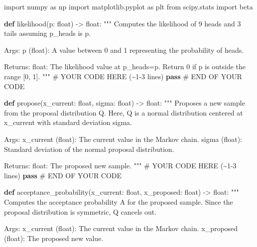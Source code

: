 \documentclass[
  letterpaper,
  DIV=11,
  numbers=noendperiod,
  oneside]{scrreprt}
\newenvironment{Shaded}{\begin{snugshade}}{\end{snugshade}}
\newcommand{\BuiltInTok}[1]{\textcolor[rgb]{0.00,0.23,0.31}{#1}}
\newcommand{\CommentTok}[1]{\textcolor[rgb]{0.37,0.37,0.37}{#1}}
\newcommand{\ControlFlowTok}[1]{\textcolor[rgb]{0.00,0.23,0.31}{\textbf{#1}}}
\newcommand{\ImportTok}[1]{\textcolor[rgb]{0.00,0.46,0.62}{#1}}
\newcommand{\KeywordTok}[1]{\textcolor[rgb]{0.00,0.23,0.31}{\textbf{#1}}}
\newcommand{\NormalTok}[1]{\textcolor[rgb]{0.00,0.23,0.31}{#1}}
\newcommand{\OperatorTok}[1]{\textcolor[rgb]{0.37,0.37,0.37}{#1}}
\newcommand{\RegionMarkerTok}[1]{\textcolor[rgb]{0.00,0.23,0.31}{#1}}
\theoremstyle{remark}
\begin{document}
\begin{Shaded}
\begin{Highlighting}[]
\ImportTok{import}\NormalTok{ numpy }\ImportTok{as}\NormalTok{ np}
\ImportTok{import}\NormalTok{ matplotlib.pyplot }\ImportTok{as}\NormalTok{ plt}
\ImportTok{from}\NormalTok{ scipy.stats }\ImportTok{import}\NormalTok{ beta}

\KeywordTok{def}\NormalTok{ likelihood(p: }\BuiltInTok{float}\NormalTok{) }\OperatorTok{{-}\textgreater{}} \BuiltInTok{float}\NormalTok{:}
    \CommentTok{"""}
\CommentTok{    Computes the likelihood of 9 heads and 3 tails assuming p\_heads is p.}

\CommentTok{    Args:}
\CommentTok{    p (float): A value between 0 and 1 representing the probability of heads.}

\CommentTok{    Returns:}
\CommentTok{    float: The likelihood value at p\_heads=p. Return 0 if p is outside the range [0, 1].}
\CommentTok{    """}
    \CommentTok{\# YOUR CODE HERE (\textasciitilde{}1{-}3 lines)}
    \ControlFlowTok{pass}
    \CommentTok{\# }\RegionMarkerTok{END}\CommentTok{ OF YOUR CODE}


\KeywordTok{def}\NormalTok{ propose(x\_current: }\BuiltInTok{float}\NormalTok{, sigma: }\BuiltInTok{float}\NormalTok{) }\OperatorTok{{-}\textgreater{}} \BuiltInTok{float}\NormalTok{:}
    \CommentTok{"""}
\CommentTok{    Proposes a new sample from the proposal distribution Q.}
\CommentTok{    Here, Q is a normal distribution centered at x\_current with standard deviation sigma.}

\CommentTok{    Args:}
\CommentTok{    x\_current (float): The current value in the Markov chain.}
\CommentTok{    sigma (float): Standard deviation of the normal proposal distribution.}

\CommentTok{    Returns:}
\CommentTok{    float: The proposed new sample.}
\CommentTok{    """}
    \CommentTok{\# YOUR CODE HERE (\textasciitilde{}1{-}3 lines)}
    \ControlFlowTok{pass}
    \CommentTok{\# }\RegionMarkerTok{END}\CommentTok{ OF YOUR CODE}


\KeywordTok{def}\NormalTok{ acceptance\_probability(x\_current: }\BuiltInTok{float}\NormalTok{, x\_proposed: }\BuiltInTok{float}\NormalTok{) }\OperatorTok{{-}\textgreater{}} \BuiltInTok{float}\NormalTok{:}
    \CommentTok{"""}
\CommentTok{    Computes the acceptance probability A for the proposed sample.}
\CommentTok{    Since the proposal distribution is symmetric, Q cancels out.}

\CommentTok{    Args:}
\CommentTok{    x\_current (float): The current value in the Markov chain.}
\CommentTok{    x\_proposed (float): The proposed new value.}


\end{Highlighting}
\end{Shaded}
\end{document}
